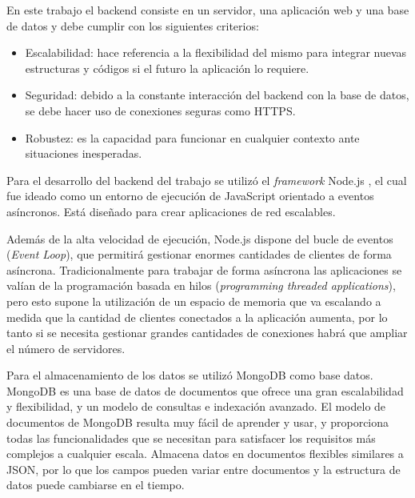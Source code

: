 En este trabajo el backend consiste en un servidor, una aplicación web y una base de datos y debe cumplir con los siguientes criterios:

\begin{itemize}
	\item Escalabilidad: hace referencia a la flexibilidad del mismo para integrar nuevas estructuras y códigos si el futuro la aplicación lo requiere.
	
	\item Seguridad: debido a la constante interacción del backend con la base de datos, se debe hacer uso de conexiones seguras como HTTPS.
	
	\item Robustez: es la capacidad para funcionar en cualquier contexto ante situaciones inesperadas.
	
\end{itemize}

Para el desarrollo del backend del trabajo se utilizó el \textit{framework} Node.js \citep{WEBSITE:19} ,  el cual fue ideado como un entorno de ejecución de JavaScript orientado a eventos asíncronos. Está diseñado para crear aplicaciones de red escalables.

Además de la alta velocidad de ejecución, Node.js dispone del bucle de eventos (\textit{Event Loop}), que permitirá gestionar enormes cantidades de clientes de forma asíncrona. Tradicionalmente para trabajar de forma asíncrona las aplicaciones se valían de la programación basada en hilos (\textit{programming threaded applications}), pero esto supone la utilización de un espacio de memoria que va escalando a medida que la cantidad de clientes conectados a la aplicación aumenta, por lo tanto si se necesita gestionar grandes cantidades de conexiones habrá que ampliar el número de servidores.

Para el almacenamiento de los datos se utilizó MongoDB \citep{WEBSITE:20} como base datos.  MongoDB es una base de datos de documentos que ofrece una gran escalabilidad y flexibilidad,  y un modelo de consultas e indexación avanzado. El modelo de documentos de MongoDB resulta muy fácil de aprender y usar, y proporciona todas las funcionalidades que se necesitan para satisfacer los requisitos más complejos a cualquier escala. Almacena datos en documentos flexibles similares a JSON, por lo que los campos pueden variar entre documentos y la estructura de datos puede cambiarse en el tiempo.




